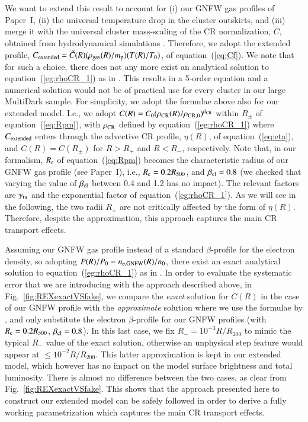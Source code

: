 \documentclass[useAMS,usenatbib]{mn2e}
\begin{document}
\begin{appendix}
We want to extend this result to account for (i) our GNFW gas profiles of
Paper~I, (ii) the universal temperature drop in the cluster
outskirts, and (iii) merge it with the universal cluster mass-scaling of the CR
normalization, $\tilde{C}$, obtained from hydrodynamical simulations
\citep{2010MNRAS.409..449P}.  Therefore, we adopt the extended profile,
$C_{\rm{extended}} = \tilde{C}(R) (\rho_{{\mathrm{gas}}}(R)/m_{\mathrm{p}}) (T(R)/T_0)$, of
equation~(\ref{eq:Cf}). We note that for such a choice, there does not any more
exist an analytical solution to equation~(\ref{eg:rhoCR_1}) as in
\cite{2011A&A...527A..99E}. This results in a 5-order equation and a numerical
solution would not be of practical use for every cluster in our large MultiDark
sample. For simplicity, we adopt the formulae above also for our extended
model. I.e., we adopt
$C(R)=C_{0}(\rho_{{\mathrm{CR}}}(R)/\rho_{{\mathrm{CR}},0})^{\beta_{{\mathrm{CR}}}}$ within
$R_{\pm}$ of equation~(\ref{eq:Rpm}), with $\rho_{{\mathrm{CR}}}$ defined by
equation~(\ref{eg:rhoCR_1}) where $C_{{\mathrm{extended}}}$ enters through the
advective CR profile, $\eta(R)$, of equation~(\ref{eq:eta}), and $C(R) =
C(R_{\pm})$ for $R > R_{+}$ and $R < R_{-}$, respectively.  Note that, in our
formalism, $R_{{\mathrm{c}}}$ of equation~(\ref{eq:Rpm}) becomes the characteristic
radius of our GNFW gas profile (see Paper~I), i.e., $R_{{\mathrm{c}}} =
0.2 R_{500}$, and $\beta_{{\mathrm{cl}}}=0.8$ (we checked that varying the value of
$\beta_{{\mathrm{cl}}}$ between 0.4 and 1.2 has no impact).  The relevant factors are
$\gamma_{{\mathrm{tu}}}$ and the exponential factor of
equation~(\ref{eg:rhoCR_1}). As we will see in the following, the two radii
$R_{\pm}$ are not critically affected by the form of $\eta(R)$. Therefore,
despite the approximation, this approach captures the main CR transport effects.

Assuming our GNFW gas profile instead of a standard $\beta$-profile for the
electron density, so adopting $P(R)/P_{0}=n_{{\mathrm{e,GNFW}}}(R)/n_{0}$, there
exist an exact analytical solution to equation~(\ref{eg:rhoCR_1}) as in
\cite{2011A&A...527A..99E}. In order to evaluate the systematic error that we
are introducing with the approach described above, in
Fig.~\ref{fig:REXexactVSfake}, we compare the \emph{exact} solution for $C(R)$
in the case of our GNFW profile with the \emph{approximate} solution where we
use the formulae by \cite{2011A&A...527A..99E}, and only substitute the electron
$\beta$-profile for our GNFW profiles (with $R_{{\mathrm{c}}} = 0.2 R_{500}$,
$\beta_{{\mathrm{cl}}}=0.8$). In this last case, we fix $R_{-}=10^{-3}R/R_{200}$ to
mimic the typical $R_{-}$ value of the exact solution, otherwise an unphysical
step feature would appear at $\leq10^{-2}R/R_{200}$. This latter approximation
is kept in our extended model, which however has no impact on the model surface
brightness and total luminosity. There is almost no difference between the two
cases, as clear from Fig.~\ref{fig:REXexactVSfake}. This shows that the approach
presented here to construct our extended model can be safely followed in order to
derive a fully working parametrization which captures the main CR transport
effects.


\end{appendix}
\end{document}
